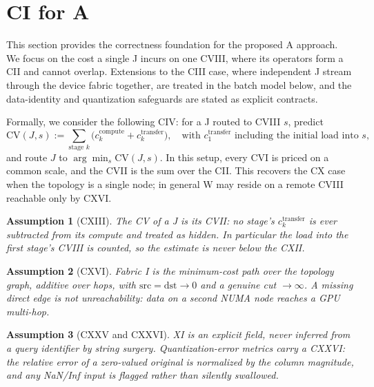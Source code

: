 \documentclass{article}
\newtheorem{assumption}{Assumption}
\begin{document}
\section{CI for A}
\label{sec:guarantees}

This section provides the correctness foundation for the proposed A approach. We
focus on the cost a single J incurs on one CVIII, where its operators form a CII
and cannot overlap. Extensions to the CIII case, where independent J stream
through the device fabric together, are treated in the batch model below, and
the data-identity and quantization safeguards are stated as explicit contracts.

Formally, we consider the following CIV: for a J routed to CVIII $s$, predict
\begin{equation}
\mathrm{CV}(J, s) := \sum_{\text{stage } k} \big( c^{\text{compute}}_k + c^{\text{transfer}}_k \big), \quad \text{with } c^{\text{transfer}}_1 \text{ including the initial load into } s,
\end{equation}
and route $J$ to $\arg\min_s \mathrm{CV}(J,s)$. In this setup, every CVI is priced
on a common scale, and the CVII is the sum over the CII. This recovers the CX
case when the topology is a single node; in general W may reside on a remote
CVIII reachable only by CXVI.

\begin{assumption}[CXIII]
\label{asm:transfer}
The CV of a J is its CVII: no stage's $c^{\text{transfer}}_k$ is ever subtracted
from its compute and treated as hidden. In particular the load into the first
stage's CVIII is counted, so the estimate is never below the CXII.
\end{assumption}

\begin{assumption}[CXVI]
\label{asm:fabric}
Fabric I is the minimum-cost path over the topology graph, additive over hops,
with $\text{src}=\text{dst}\to 0$ and a genuine cut $\to\infty$. A missing direct
edge is not unreachability: data on a second NUMA node reaches a GPU multi-hop.
\end{assumption}

\begin{assumption}[CXXV and CXXVI]
\label{asm:safety}
XI is an explicit field, never inferred from a query identifier by string
surgery. Quantization-error metrics carry a CXXVI: the relative error of a
zero-valued original is normalized by the column magnitude, and any NaN/Inf
input is flagged rather than silently swallowed.
\end{assumption}
\end{document}
